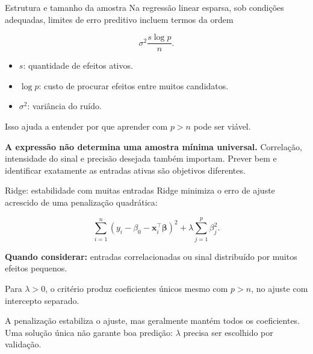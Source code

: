 \documentclass[
  10pt,
  ignorenonframetext,
  aspectratio=169,
  brazilian,
]{beamer}
\providecommand{\tightlist}{%
  \setlength{\itemsep}{0pt}\setlength{\parskip}{0pt}}
\begin{document}
\begin{frame}{Estrutura e tamanho da amostra}
\protect{}\label{estrutura-e-tamanho-da-amostra}
Na regressão linear esparsa, sob condições adequadas, limites de erro
preditivo incluem termos da ordem

\[
\boxed{\sigma^2\frac{s\log p}{n}.}
\]

\begin{itemize}
\tightlist
\item
  \(s\): quantidade de efeitos ativos.
\item
  \(\log p\): custo de procurar efeitos entre muitos candidatos.
\item
  \(\sigma^2\): variância do ruído.
\end{itemize}

Isso ajuda a entender por que aprender com \(p>n\) pode ser viável.

\textbf{A expressão não determina uma amostra mínima universal.}
Correlação, intensidade do sinal e precisão desejada também importam.
Prever bem e identificar exatamente as entradas ativas são objetivos
diferentes.

\end{frame}

\begin{frame}{Ridge: estabilidade com muitas entradas}
\protect{}\label{ridge-estabilidade-com-muitas-entradas}
Ridge minimiza o erro de ajuste acrescido de uma penalização quadrática:

\[
\sum_{i=1}^{n}(y_i-\beta_0-\mathbf x_i^\top\boldsymbol\beta)^2
+\lambda\sum_{j=1}^{p}\beta_j^2.
\]

\textbf{Quando considerar:} entradas correlacionadas ou sinal
distribuído por muitos efeitos pequenos.

Para \(\lambda>0\), o critério produz coeficientes únicos mesmo com
\(p>n\), no ajuste com intercepto separado.

A penalização estabiliza o ajuste, mas geralmente mantém todos os
coeficientes. Uma solução única não garante boa predição: \(\lambda\)
precisa ser escolhido por validação.
\end{frame}
\end{document}
